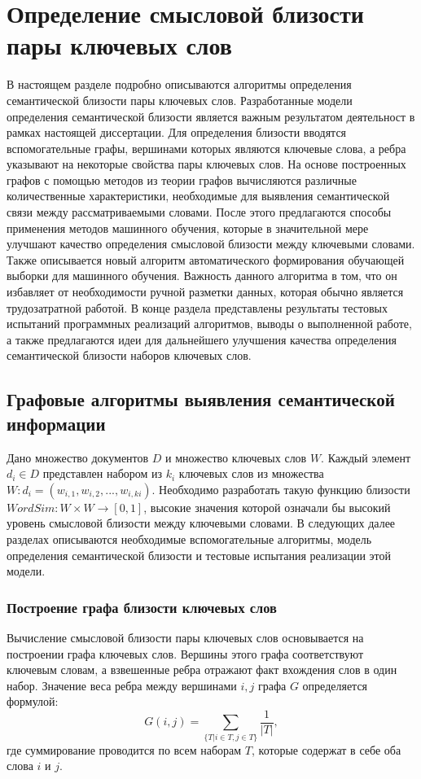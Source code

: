 \chapter{Определение смысловой близости пары ключевых слов} \label{chapt_word_similarity}
В настоящем разделе подробно описываются алгоритмы определения семантической близости пары ключевых слов. Разработанные модели определения семантической близости является важным результатом деятельност в рамках настоящей диссертации.
Для определения близости вводятся вспомогательные графы, вершинами которых являются ключевые слова, а ребра указывают на некоторые свойства пары ключевых слов.
На основе построенных графов с помощью методов из теории графов вычисляются различные количественные характеристики, необходимые для выявления семантической связи между рассматриваемыми словами.
После этого предлагаются способы применения методов машинного обучения, которые в значительной мере улучшают качество определения смысловой близости между ключевыми словами. 
Также описывается новый алгоритм автоматического формирования обучающей выборки для машинного обучения. Важность данного алгоритма в том, что он избавляет от необходимости ручной разметки данных, которая обычно является трудозатратной работой.
В конце раздела представлены результаты тестовых испытаний программных реализаций алгоритмов, выводы о выполненной работе, а также предлагаются идеи для дальнейшего улучшения качества определения семантической близости наборов ключевых слов.

\section{Графовые алгоритмы выявления семантической информации}
Дано множество документов $D$ и множество ключевых слов $W$. Каждый элемент $d_i \in D$ представлен набором из $k_i$ ключевых слов из множества $W: d_i = (w_{i,1},w_{i,2},...,w_{i,ki})$. Необходимо разработать такую функцию близости $WordSim : W \times W \rightarrow [0, 1]$, высокие значения которой означали бы высокий уровень смысловой близости между ключевыми словами. В следующих далее разделах описываются необходимые вспомогательные алгоритмы, модель определения семантической близости и тестовые испытания реализации этой модели.

\subsection{Построение графа близости ключевых слов} \label{sect1_1}
Вычисление смысловой близости пары ключевых слов основывается на построении графа ключевых слов. Вершины этого графа соответствуют ключевым словам, а взвешенные ребра отражают факт вхождения слов в один набор. Значение веса ребра между вершинами $i, j$ графа $G$ определяется формулой:
$$ G(i, j) = \sum_{\{T|i\in T, j \in T\}}\frac{1}{|T|}, $$
где суммирование проводится по всем наборам $T$, которые содержат в себе оба слова $i$ и $j$.

